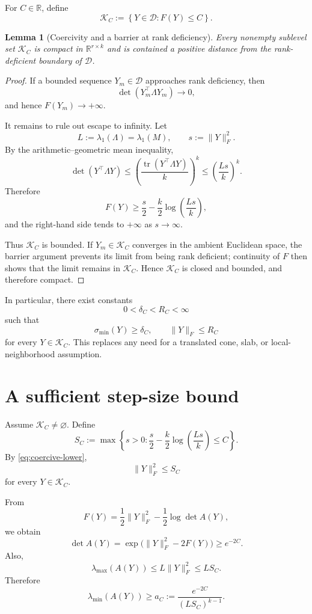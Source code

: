 \documentclass[11pt]{article}
\newcommand{\RR}{\mathbb{R}}
\newcommand{\tr}{\operatorname{tr}}
\newcommand{\cD}{\mathcal{D}}
\newcommand{\cK}{\mathcal{K}}
\newtheorem{lemma}{Lemma}
\begin{document}
For \(C\in\RR\), define
\[
\cK_C
:=
\left\{
Y\in\cD:F(Y)\le C
\right\}.
\]

\begin{lemma}[Coercivity and a barrier at rank deficiency]
\label{lem:coercivity}
Every nonempty sublevel set \(\cK_C\) is compact in
\(\RR^{r\times k}\) and is contained a positive distance from the rank-deficient
boundary of \(\cD\).
\end{lemma}

\begin{proof}
If a bounded sequence \(Y_m\in\cD\) approaches rank deficiency, then
\[
\det(Y_m^\top\Lambda Y_m)\longrightarrow0,
\]
and hence \(F(Y_m)\to+\infty\).

It remains to rule out escape to infinity. Let
\[
L:=\lambda_1(\Lambda)=\lambda_1(M),
\qquad
s:=\|Y\|_F^2.
\]
By the arithmetic--geometric mean inequality,
\[
\det(Y^\top\Lambda Y)
\le
\left(
\frac{\tr(Y^\top\Lambda Y)}{k}
\right)^k
\le
\left(\frac{Ls}{k}\right)^k.
\]
Therefore
\[
F(Y)
\ge
\frac{s}{2}
-
\frac{k}{2}\log\left(\frac{Ls}{k}\right),
\tag{5}
\label{eq:coercive-lower}
\]
and the right-hand side tends to \(+\infty\) as \(s\to\infty\).

Thus \(\cK_C\) is bounded. If \(Y_m\in\cK_C\) converges in the ambient
Euclidean space, the barrier argument prevents its limit from being rank
deficient; continuity of \(F\) then shows that the limit remains in \(\cK_C\).
Hence \(\cK_C\) is closed and bounded, and therefore compact.
\end{proof}

In particular, there exist constants
\[
0<\delta_C<R_C<\infty
\]
such that
\[
\sigma_{\min}(Y)\ge\delta_C,
\qquad
\|Y\|_F\le R_C
\]
for every \(Y\in\cK_C\). This replaces any need for a translated cone, slab,
or local-neighborhood assumption.

\section{A sufficient step-size bound}

Assume \(\cK_C\neq\varnothing\). Define
\[
S_C
:=
\max\left\{
s>0:
\frac{s}{2}
-
\frac{k}{2}\log\left(\frac{Ls}{k}\right)
\le C
\right\}.
\tag{6}
\label{eq:S-C}
\]
By \eqref{eq:coercive-lower},
\[
\|Y\|_F^2\le S_C
\]
for every \(Y\in\cK_C\).

From
\[
F(Y)
=
\frac12\|Y\|_F^2
-
\frac12\log\det A(Y),
\]
we obtain
\[
\det A(Y)
=
\exp\bigl(\|Y\|_F^2-2F(Y)\bigr)
\ge
e^{-2C}.
\]
Also,
\[
\lambda_{\max}(A(Y))
\le
L\|Y\|_F^2
\le
LS_C.
\]
Therefore
\[
\lambda_{\min}(A(Y))
\ge
a_C
:=
\frac{e^{-2C}}{(LS_C)^{k-1}}.
\tag{7}
\label{eq:a-C}
\]
\end{document}
